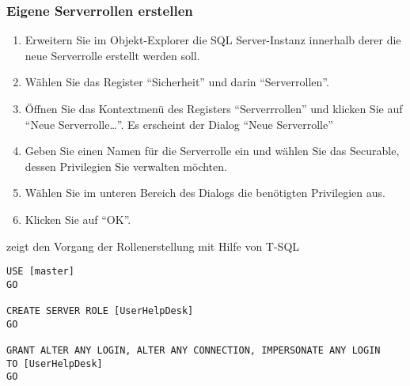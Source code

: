         \subsubsection{Eigene Serverrollen erstellen}
          \begin{enumerate}
            \item Erweitern Sie im Objekt-Explorer die SQL Server-Instanz
            innerhalb derer die neue Serverrolle erstellt werden soll.
            \item Wählen Sie das Register \enquote{Sicherheit} und darin
            \enquote{Serverrollen}.
            \item Öffnen Sie das Kontextmenü des Registers
            \enquote{Serverrrollen} und klicken Sie auf \enquote{Neue
            Serverrolle\ldots}. Es erscheint der Dialog \enquote{Neue
            Serverrolle}
            \item Geben Sie einen Namen für die Serverrolle ein und wählen Sie
            das Securable, dessen Privilegien Sie verwalten möchten.
            \item Wählen Sie im unteren Bereich des Dialogs die benötigten
            Privilegien aus.
            \item Klicken Sie auf \enquote{OK}.
          \end{enumerate}
           zeigt den Vorgang der Rollenerstellung mit Hilfe
          von T-SQL
          \begin{lstlisting}[language=ms_sql,caption={Eine
          Serverrolle erstellen},label=sql19_03]
USE [master]
GO

CREATE SERVER ROLE [UserHelpDesk]
GO

GRANT ALTER ANY LOGIN, ALTER ANY CONNECTION, IMPERSONATE ANY LOGIN
TO [UserHelpDesk]
GO
        \end{lstlisting}
        \begin{literaturinternet}
          \item \cite{ee677627}
          \item \cite{ee677610}
        \end{literaturinternet}          
